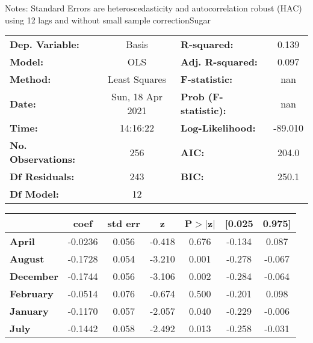 Notes: \newline
 [1] Standard Errors are heteroscedasticity and autocorrelation robust (HAC) using 12 lags and without small sample correctionSugar\begin{center}
\begin{tabular}{lclc}
\toprule
\textbf{Dep. Variable:}    &      Basis       & \textbf{  R-squared:         } &     0.139   \\
\textbf{Model:}            &       OLS        & \textbf{  Adj. R-squared:    } &     0.097   \\
\textbf{Method:}           &  Least Squares   & \textbf{  F-statistic:       } &       nan   \\
\textbf{Date:}             & Sun, 18 Apr 2021 & \textbf{  Prob (F-statistic):} &      nan    \\
\textbf{Time:}             &     14:16:22     & \textbf{  Log-Likelihood:    } &   -89.010   \\
\textbf{No. Observations:} &         256      & \textbf{  AIC:               } &     204.0   \\
\textbf{Df Residuals:}     &         243      & \textbf{  BIC:               } &     250.1   \\
\textbf{Df Model:}         &          12      & \textbf{                     } &             \\
\bottomrule
\end{tabular}
\begin{tabular}{lcccccc}
                   & \textbf{coef} & \textbf{std err} & \textbf{z} & \textbf{P$> |$z$|$} & \textbf{[0.025} & \textbf{0.975]}  \\
\midrule
\textbf{April}     &      -0.0236  &        0.056     &    -0.418  &         0.676        &       -0.134    &        0.087     \\
\textbf{August}    &      -0.1728  &        0.054     &    -3.210  &         0.001        &       -0.278    &       -0.067     \\
\textbf{December}  &      -0.1744  &        0.056     &    -3.106  &         0.002        &       -0.284    &       -0.064     \\
\textbf{February}  &      -0.0514  &        0.076     &    -0.674  &         0.500        &       -0.201    &        0.098     \\
\textbf{January}   &      -0.1170  &        0.057     &    -2.057  &         0.040        &       -0.229    &       -0.006     \\
\textbf{July}      &      -0.1442  &        0.058     &    -2.492  &         0.013        &       -0.258    &       -0.031     \\

\end{tabular}
\end{center}
